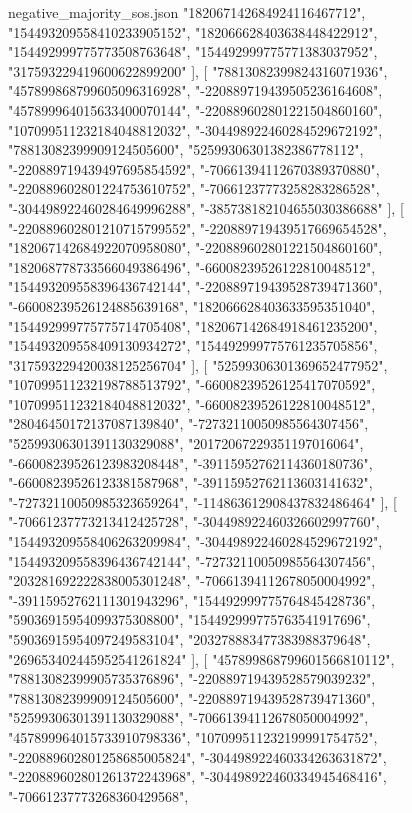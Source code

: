 \begin{filecontents*}[overwrite]{negative_majority_sos.json}
    "182067142684924116467712",
    "154493209558410233905152",
    "182066628403638448422912",
    "154492999775773508763648",
    "154492999775771383037952",
    "317593229419600622899200"
   ],
   [
    "78813082399824316071936",
    "457899868799605096316928",
    "-220889719439505236164608",
    "457899964015633400070144",
    "-220889602801221504860160",
    "107099511232184048812032",
    "-304498922460284529672192",
    "78813082399909124505600",
    "52599306301382386778112",
    "-220889719439497695854592",
    "-70661394112670389370880",
    "-220889602801224753610752",
    "-70661237773258283286528",
    "-304498922460284649996288",
    "-385738182104655030386688"
   ],
   [
    "-220889602801210715799552",
    "-220889719439517669654528",
    "182067142684922070958080",
    "-220889602801221504860160",
    "182068778733566049386496",
    "-66008239526122810048512",
    "154493209558396436742144",
    "-220889719439528739471360",
    "-66008239526124885639168",
    "182066628403633595351040",
    "154492999775775714705408",
    "182067142684918461235200",
    "154493209558409130934272",
    "154492999775761235705856",
    "317593229420038125256704"
   ],
   [
    "52599306301369652477952",
    "107099511232198788513792",
    "-66008239526125417070592",
    "107099511232184048812032",
    "-66008239526122810048512",
    "28046450172137087139840",
    "-72732110050985564307456",
    "52599306301391130329088",
    "20172067229351197016064",
    "-66008239526123983208448",
    "-39115952762114360180736",
    "-66008239526123381587968",
    "-39115952762113603141632",
    "-72732110050985323659264",
    "-114863612908437832486464"
   ],
   [
    "-70661237773213412425728",
    "-304498922460326602997760",
    "154493209558406263209984",
    "-304498922460284529672192",
    "154493209558396436742144",
    "-72732110050985564307456",
    "203281692222838005301248",
    "-70661394112678050004992",
    "-39115952762111301943296",
    "154492999775764845428736",
    "59036915954099375308800",
    "154492999775763541917696",
    "59036915954097249583104",
    "203278883477383988379648",
    "269653402445952541261824"
   ],
   [
    "457899868799601566810112",
    "78813082399905735376896",
    "-220889719439528579039232",
    "78813082399909124505600",
    "-220889719439528739471360",
    "52599306301391130329088",
    "-70661394112678050004992",
    "457899964015733910798336",
    "107099511232199991754752",
    "-220889602801258685005824",
    "-304498922460334263631872",
    "-220889602801261372243968",
    "-304498922460334945468416",
    "-70661237773268360429568",

\end{filecontents*}
